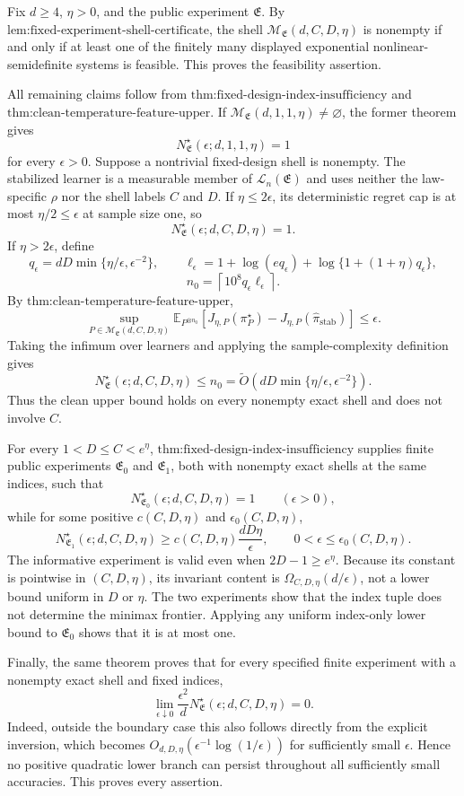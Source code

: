 Fix \(d\ge4\), \(\eta>0\), and the public experiment \(\mathfrak E\). By \(\text{lem:fixed-experiment-shell-certificate}\), the shell \(\mathcal M_{\mathfrak E}(d,C,D,\eta)\) is nonempty if and only if at least one of the finitely many displayed exponential nonlinear-semidefinite systems is feasible. This proves the feasibility assertion.

All remaining claims follow from \(\text{thm:fixed-design-index-insufficiency}\) and \(\text{thm:clean-temperature-feature-upper}\). If \(\mathcal M_{\mathfrak E}(d,1,1,\eta)\ne\varnothing\), the former theorem gives
\[
N^\star_{\mathfrak E}(\epsilon;d,1,1,\eta)=1
\]
for every \(\epsilon>0\). Suppose a nontrivial fixed-design shell is nonempty. The stabilized learner is a measurable member of \(\mathcal L_n(\mathfrak E)\) and uses neither the law-specific \(\rho\) nor the shell labels \(C\) and \(D\). If \(\eta\le2\epsilon\), its deterministic regret cap is at most \(\eta/2\le\epsilon\) at sample size one, so
\[
N^\star_{\mathfrak E}(\epsilon;d,C,D,\eta)=1.
\]
If \(\eta>2\epsilon\), define
\[
q_\epsilon=dD\min\{\eta/\epsilon,\epsilon^{-2}\},
\qquad
\ell_\epsilon=1+\log(eq_\epsilon)+\log\{1+(1+\eta)q_\epsilon\},
\]
\[
n_0=\left\lceil10^8q_\epsilon\ell_\epsilon\right\rceil.
\]
By \(\text{thm:clean-temperature-feature-upper}\),
\[
\sup_{P\in\mathcal M_{\mathfrak E}(d,C,D,\eta)}
\mathbb E_{P^{\otimes n_0}}
\left[J_{\eta,P}(\pi_P^\star)-J_{\eta,P}(\widehat\pi_{\mathrm{stab}})\right]
\le\epsilon.
\]
Taking the infimum over learners and applying the sample-complexity definition gives
\[
N^\star_{\mathfrak E}(\epsilon;d,C,D,\eta)
\le n_0
=\widetilde O\!\left(dD\min\{\eta/\epsilon,\epsilon^{-2}\}\right).
\]
Thus the clean upper bound holds on every nonempty exact shell and does not involve \(C\).

For every \(1<D\le C<e^\eta\), \(\text{thm:fixed-design-index-insufficiency}\) supplies finite public experiments \(\mathfrak E_0\) and \(\mathfrak E_1\), both with nonempty exact shells at the same indices, such that
\[
N^\star_{\mathfrak E_0}(\epsilon;d,C,D,\eta)=1
\qquad(\epsilon>0),
\]
while for some positive \(c(C,D,\eta)\) and \(\epsilon_0(C,D,\eta)\),
\[
N^\star_{\mathfrak E_1}(\epsilon;d,C,D,\eta)
\ge c(C,D,\eta)\frac{dD\eta}{\epsilon},
\qquad 0<\epsilon\le\epsilon_0(C,D,\eta).
\]
The informative experiment is valid even when \(2D-1\ge e^\eta\). Because its constant is pointwise in \((C,D,\eta)\), its invariant content is \(\Omega_{C,D,\eta}(d/\epsilon)\), not a lower bound uniform in \(D\) or \(\eta\). The two experiments show that the index tuple does not determine the minimax frontier. Applying any uniform index-only lower bound to \(\mathfrak E_0\) shows that it is at most one.

Finally, the same theorem proves that for every specified finite experiment with a nonempty exact shell and fixed indices,
\[
\lim_{\epsilon\downarrow0}\frac{\epsilon^2}{d}N^\star_{\mathfrak E}(\epsilon;d,C,D,\eta)=0.
\]
Indeed, outside the boundary case this also follows directly from the explicit inversion, which becomes \(O_{d,D,\eta}(\epsilon^{-1}\log(1/\epsilon))\) for sufficiently small \(\epsilon\). Hence no positive quadratic lower branch can persist throughout all sufficiently small accuracies. This proves every assertion.